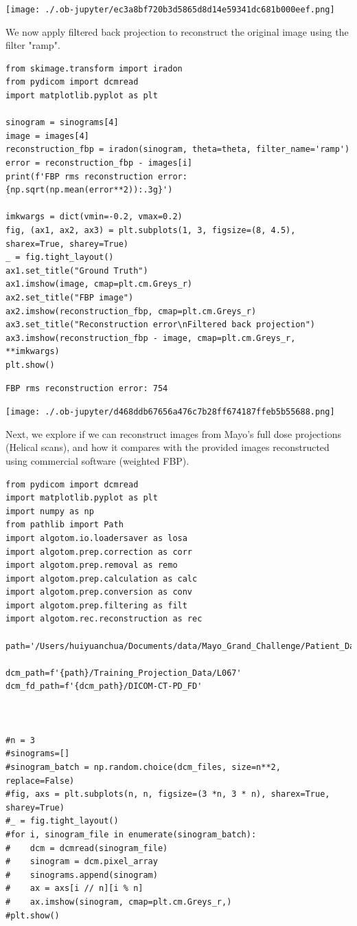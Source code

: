 \documentclass[a4paper, 11pt]{article}
\begin{document}
\begin{center}
\texttt{[image: ./.ob-jupyter/ec3a8bf720b3d5865d8d14e59341dc681b000eef.png]}
\end{center}

We now apply filtered back projection to reconstruct the original image using the filter "ramp".
\begin{verbatim}
from skimage.transform import iradon
from pydicom import dcmread
import matplotlib.pyplot as plt

sinogram = sinograms[4]
image = images[4]
reconstruction_fbp = iradon(sinogram, theta=theta, filter_name='ramp')
error = reconstruction_fbp - images[i]
print(f'FBP rms reconstruction error: {np.sqrt(np.mean(error**2)):.3g}')

imkwargs = dict(vmin=-0.2, vmax=0.2)
fig, (ax1, ax2, ax3) = plt.subplots(1, 3, figsize=(8, 4.5), sharex=True, sharey=True)
_ = fig.tight_layout()
ax1.set_title("Ground Truth")
ax1.imshow(image, cmap=plt.cm.Greys_r)
ax2.set_title("FBP image")
ax2.imshow(reconstruction_fbp, cmap=plt.cm.Greys_r)
ax3.set_title("Reconstruction error\nFiltered back projection")
ax3.imshow(reconstruction_fbp - image, cmap=plt.cm.Greys_r, **imkwargs)
plt.show()
\end{verbatim}

\begin{verbatim}
FBP rms reconstruction error: 754
\end{verbatim}

\begin{center}
\texttt{[image: ./.ob-jupyter/d468ddb67656a476c7b28ff674187ffeb5b55688.png]}
\end{center}

Next, we explore if we can reconstruct images from Mayo's full dose projections (Helical scans), and how it compares with the provided images reconstructed using commercial software (weighted FBP).
\begin{verbatim}
from pydicom import dcmread
import matplotlib.pyplot as plt
import numpy as np
from pathlib import Path
import algotom.io.loadersaver as losa
import algotom.prep.correction as corr
import algotom.prep.removal as remo
import algotom.prep.calculation as calc
import algotom.prep.conversion as conv
import algotom.prep.filtering as filt
import algotom.rec.reconstruction as rec

path='/Users/huiyuanchua/Documents/data/Mayo_Grand_Challenge/Patient_Data'

dcm_path=f'{path}/Training_Projection_Data/L067'
dcm_fd_path=f'{dcm_path}/DICOM-CT-PD_FD'



#n = 3
#sinograms=[]
#sinogram_batch = np.random.choice(dcm_files, size=n**2, replace=False)
#fig, axs = plt.subplots(n, n, figsize=(3 *n, 3 * n), sharex=True, sharey=True)
#_ = fig.tight_layout()
#for i, sinogram_file in enumerate(sinogram_batch):
#    dcm = dcmread(sinogram_file)
#    sinogram = dcm.pixel_array
#    sinograms.append(sinogram)
#    ax = axs[i // n][i % n]
#    ax.imshow(sinogram, cmap=plt.cm.Greys_r,)
#plt.show()
\end{verbatim}
\end{document}
